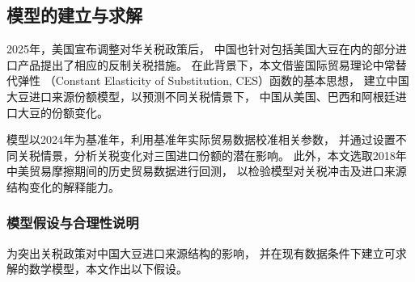 \documentclass{apmcmthesis}
\begin{document}
\subsection{模型的建立与求解}
\label{subsec:model_q1}

2025年，美国宣布调整对华关税政策后，
中国也针对包括美国大豆在内的部分进口产品提出了相应的反制关税措施。
在此背景下，本文借鉴国际贸易理论中常替代弹性
（Constant Elasticity of Substitution, CES）函数的基本思想，
建立中国大豆进口来源份额模型，以预测不同关税情景下，
中国从美国、巴西和阿根廷进口大豆的份额变化。

模型以2024年为基准年，利用基准年实际贸易数据校准相关参数，
并通过设置不同关税情景，分析关税变化对三国进口份额的潜在影响。
此外，本文选取2018年中美贸易摩擦期间的历史贸易数据进行回测，
以检验模型对关税冲击及进口来源结构变化的解释能力。

\subsubsection{模型假设与合理性说明}

为突出关税政策对中国大豆进口来源结构的影响，
并在现有数据条件下建立可求解的数学模型，本文作出以下假设。
\end{document}
